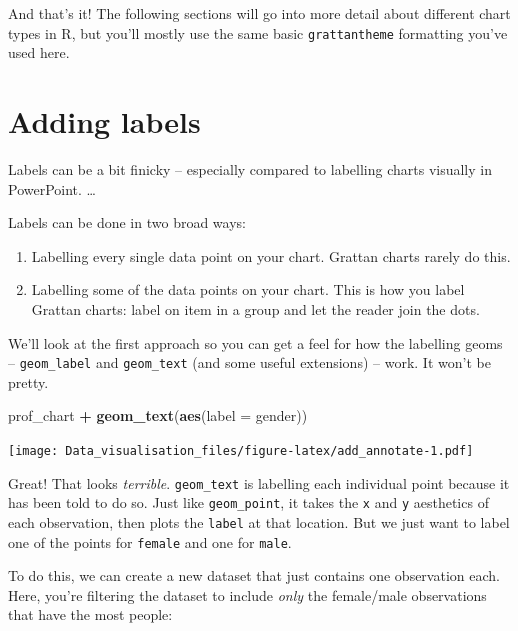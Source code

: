\documentclass[
]{book}
\newenvironment{Shaded}{\begin{snugshade}}{\end{snugshade}}
\newcommand{\DataTypeTok}[1]{\textcolor[rgb]{0.13,0.29,0.53}{#1}}
\newcommand{\KeywordTok}[1]{\textcolor[rgb]{0.13,0.29,0.53}{\textbf{#1}}}
\newcommand{\NormalTok}[1]{#1}
\newcommand{\OperatorTok}[1]{\textcolor[rgb]{0.81,0.36,0.00}{\textbf{#1}}}
\newcommand{\StringTok}[1]{\textcolor[rgb]{0.31,0.60,0.02}{#1}}
\providecommand{\tightlist}{%
  \setlength{\itemsep}{0pt}\setlength{\parskip}{0pt}}
\begin{document}
And that's it! The following sections will go into more detail about different chart types in R, but you'll mostly use the same basic \texttt{grattantheme} formatting you've used here.

\hypertarget{adding-labels}{%
\section{Adding labels}\label{adding-labels}}

Labels can be a bit finicky -- especially compared to labelling charts visually in PowerPoint. \ldots{}

Labels can be done in two broad ways:

\begin{enumerate}
\def\labelenumi{\arabic{enumi}.}
\tightlist
\item
  Labelling every single data point on your chart. Grattan charts rarely do this.
\item
  Labelling some of the data points on your chart. This is how you label Grattan charts: label on item in a group and let the reader join the dots.
\end{enumerate}

We'll look at the first approach so you can get a feel for how the labelling geoms -- \texttt{geom\_label} and \texttt{geom\_text} (and some useful extensions) -- work. It won't be pretty.

\begin{Shaded}
\begin{Highlighting}[]
\NormalTok{prof\_chart }\OperatorTok{+}
\StringTok{  }\KeywordTok{geom\_text}\NormalTok{(}\KeywordTok{aes}\NormalTok{(}\DataTypeTok{label =}\NormalTok{ gender))}
\end{Highlighting}
\end{Shaded}

\texttt{[image: Data\_visualisation\_files/figure-latex/add\_annotate-1.pdf]}

Great! That looks \emph{terrible}. \texttt{geom\_text} is labelling each individual point because it has been told to do so. Just like \texttt{geom\_point}, it takes the \texttt{x} and \texttt{y} aesthetics of each observation, then plots the \texttt{label} at that location. But we just want to label one of the points for \texttt{female} and one for \texttt{male}.

To do this, we can create a new dataset that just contains one observation each. Here, you're filtering the dataset to include \emph{only} the female/male observations that have the most people:
\end{document}
